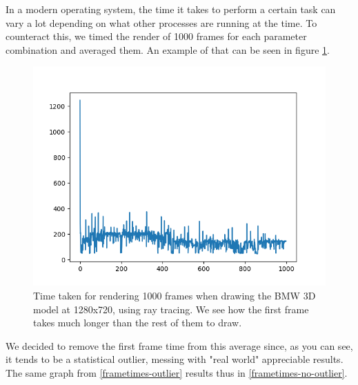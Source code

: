 In a modern operating system, the time it takes to perform a certain task can vary a lot depending on what other processes are running at the time. To counteract this, we timed the render of 1000 frames for each parameter combination and averaged them. An example of that can be seen in figure \ref{frametimes-outlier-graph}.

\begin{figure}[hbt!]
    \centering
    \includegraphics[width=1.0\textwidth]{figuras/frametime-outlier.png}
    \caption{Time taken for rendering 1000 frames when drawing the BMW 3D model at 1280x720, using ray tracing. We see how the first frame takes much longer than the rest of them to draw.}
    \label{frametimes-outlier-graph}
\end{figure}

We decided to remove the first frame time from this average since, as you can see, it tends to be a statistical outlier, messing with "real world" appreciable results. The same graph from \ref{frametimes-outlier} results thus in \ref{frametimes-no-outlier}.

